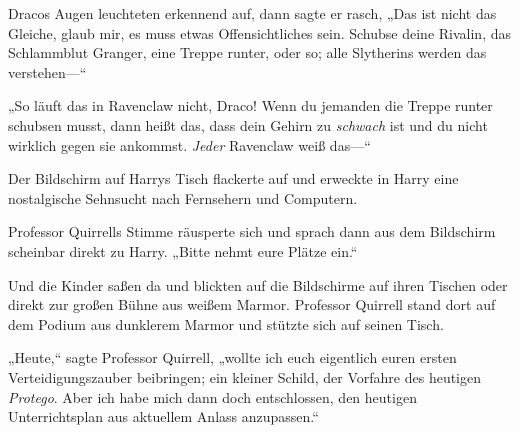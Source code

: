 Dracos Augen leuchteten erkennend auf, dann sagte er rasch, „Das ist nicht das Gleiche, glaub mir, es muss etwas Offensichtliches sein. Schubse deine Rivalin, das Schlammblut Granger, eine Treppe runter, oder so; alle Slytherins werden das verstehen—“

„So läuft das in Ravenclaw nicht, Draco! Wenn du jemanden die Treppe runter schubsen musst, dann heißt das, dass dein Gehirn zu \emph{schwach} ist und du nicht wirklich gegen sie ankommst. \emph{Jeder} Ravenclaw weiß das—“

Der Bildschirm auf Harrys Tisch flackerte auf und erweckte in Harry eine nostalgische Sehnsucht nach Fernsehern und Computern.

Professor Quirrells Stimme räusperte sich und sprach dann aus dem Bildschirm scheinbar direkt zu Harry. „Bitte nehmt eure Plätze ein.“

\later

Und die Kinder saßen da und blickten auf die Bildschirme auf ihren Tischen oder direkt zur großen Bühne aus weißem Marmor. Professor Quirrell stand dort auf dem Podium aus dunklerem Marmor und stützte sich auf seinen Tisch.

„Heute,“ sagte Professor Quirrell, „wollte ich euch eigentlich euren ersten Verteidigungszauber beibringen; ein kleiner Schild, der Vorfahre des heutigen \emph{Protego}. Aber ich habe mich dann doch entschlossen, den heutigen Unterrichtsplan aus aktuellem Anlass anzupassen.“

